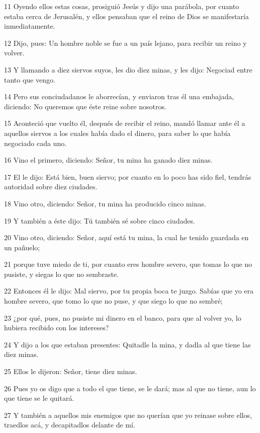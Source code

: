 \par 11 Oyendo ellos estas cosas, prosiguió Jesús y dijo una parábola, por cuanto estaba cerca de Jerusalén, y ellos pensaban que el reino de Dios se manifestaría inmediatamente.
\par 12 Dijo, pues: Un hombre noble se fue a un país lejano, para recibir un reino y volver.
\par 13 Y llamando a diez siervos suyos, les dio diez minas, y les dijo: Negociad entre tanto que vengo.
\par 14 Pero sus conciudadanos le aborrecían, y enviaron tras él una embajada, diciendo: No queremos que éste reine sobre nosotros.
\par 15 Aconteció que vuelto él, después de recibir el reino, mandó llamar ante él a aquellos siervos a los cuales había dado el dinero, para saber lo que había negociado cada uno.
\par 16 Vino el primero, diciendo: Señor, tu mina ha ganado diez minas.
\par 17 El le dijo: Está bien, buen siervo; por cuanto en lo poco has sido fiel, tendrás autoridad sobre diez ciudades.
\par 18 Vino otro, diciendo: Señor, tu mina ha producido cinco minas.
\par 19 Y también a éste dijo: Tú también sé sobre cinco ciudades.
\par 20 Vino otro, diciendo: Señor, aquí está tu mina, la cual he tenido guardada en un pañuelo;
\par 21 porque tuve miedo de ti, por cuanto eres hombre severo, que tomas lo que no pusiste, y siegas lo que no sembraste.
\par 22 Entonces él le dijo: Mal siervo, por tu propia boca te juzgo. Sabías que yo era hombre severo, que tomo lo que no puse, y que siego lo que no sembré;
\par 23 ¿por qué, pues, no pusiste mi dinero en el banco, para que al volver yo, lo hubiera recibido con los intereses?
\par 24 Y dijo a los que estaban presentes: Quitadle la mina, y dadla al que tiene las diez minas.
\par 25 Ellos le dijeron: Señor, tiene diez minas.
\par 26 Pues yo os digo que a todo el que tiene, se le dará; mas al que no tiene, aun lo que tiene se le quitará.
\par 27 Y también a aquellos mis enemigos que no querían que yo reinase sobre ellos, traedlos acá, y decapitadlos delante de mí.

